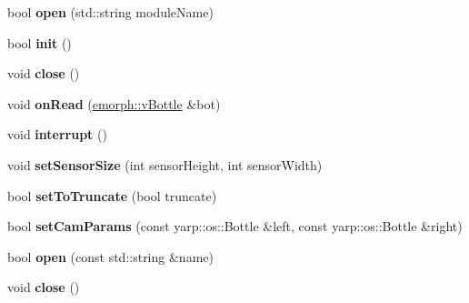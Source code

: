\begin{DoxyCompactItemize}
\item 
\hypertarget{classEventBottleManager_a82d3237530dcc455f3ceae4e1db4f6df}{bool {\bfseries open} (std\-::string module\-Name)}\label{classEventBottleManager_a82d3237530dcc455f3ceae4e1db4f6df}

\item 
\hypertarget{classEventBottleManager_af4d71177a30fdd8fc40485b91abdae10}{bool {\bfseries init} ()}\label{classEventBottleManager_af4d71177a30fdd8fc40485b91abdae10}

\item 
\hypertarget{classEventBottleManager_aa155dc6f20728e9f7ff13abf720ea6b8}{void {\bfseries close} ()}\label{classEventBottleManager_aa155dc6f20728e9f7ff13abf720ea6b8}

\item 
\hypertarget{classEventBottleManager_a9571d64d4640ef5a38f03a286d27425e}{void {\bfseries on\-Read} (\hyperlink{classemorph_1_1vBottle}{emorph\-::v\-Bottle} \&bot)}\label{classEventBottleManager_a9571d64d4640ef5a38f03a286d27425e}

\item 
\hypertarget{classEventBottleManager_a15152f9daa40714334c2da3871f959a9}{void {\bfseries interrupt} ()}\label{classEventBottleManager_a15152f9daa40714334c2da3871f959a9}

\item 
\hypertarget{classEventBottleManager_a756fda9127e0fc1f8b3781f905f6d28a}{void {\bfseries set\-Sensor\-Size} (int sensor\-Height, int sensor\-Width)}\label{classEventBottleManager_a756fda9127e0fc1f8b3781f905f6d28a}

\item 
\hypertarget{classEventBottleManager_abf9943ffed44f78430eb1f49e469beb5}{bool {\bfseries set\-To\-Truncate} (bool truncate)}\label{classEventBottleManager_abf9943ffed44f78430eb1f49e469beb5}

\item 
\hypertarget{classEventBottleManager_ab22a4a1446b8eb35a377fcd7552c63ea}{bool {\bfseries set\-Cam\-Params} (const yarp\-::os\-::\-Bottle \&left, const yarp\-::os\-::\-Bottle \&right)}\label{classEventBottleManager_ab22a4a1446b8eb35a377fcd7552c63ea}

\item 
\hypertarget{classEventBottleManager_a41ce7bd0a716ab0a88c1ad505b02d20b}{bool {\bfseries open} (const std\-::string \&name)}\label{classEventBottleManager_a41ce7bd0a716ab0a88c1ad505b02d20b}

\item 
\hypertarget{classEventBottleManager_aa155dc6f20728e9f7ff13abf720ea6b8}{void {\bfseries close} ()}\label{classEventBottleManager_aa155dc6f20728e9f7ff13abf720ea6b8}


\end{DoxyCompactItemize}
